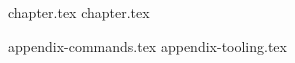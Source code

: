 \documentclass[11pt,a4paper,twoside,openright]{book}
\begin{document}
\frontmatter




\cleardoublepage
\tableofcontents
\cleardoublepage

\mainmatter

{chapter.tex}
{chapter.tex}

\appendix
{appendix-commands.tex}
{appendix-tooling.tex}

\backmatter

\cleardoublepage
{}
{}
\printindex
\end{document}
